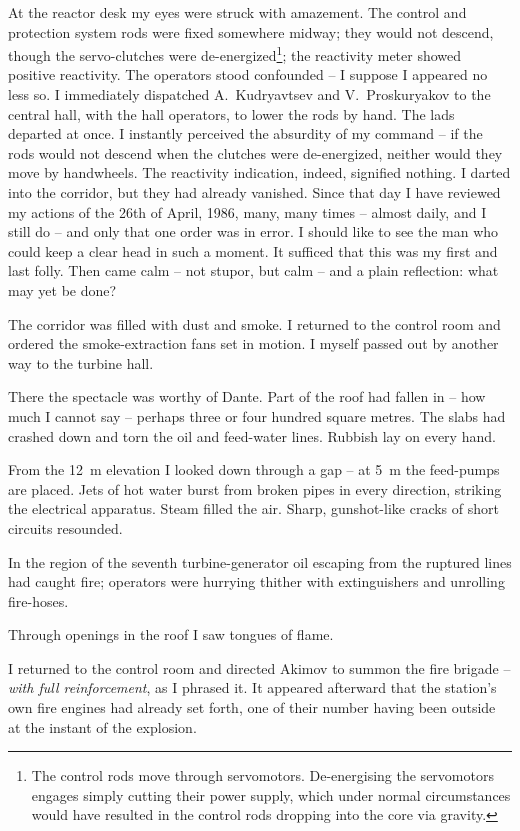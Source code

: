 \documentclass[openright]{bookest}
\begin{document}
At the reactor desk my eyes were struck with amazement. The control and protection system rods were fixed somewhere midway; they would not descend, though the servo-clutches were de-energized\footnote{The control rods move through servomotors. De-energising the servomotors engages simply cutting their power supply, which under normal circumstances would have resulted in the control rods dropping into the core via gravity.}; the reactivity meter showed positive reactivity. The operators stood confounded -- I suppose I appeared no less so. I immediately dispatched A.~Kudryavtsev and V.~Proskuryakov to the central hall, with the hall operators, to lower the rods by hand. The lads departed at once. I instantly perceived the absurdity of my command -- if the rods would not descend when the clutches were de-energized, neither would they move by handwheels. The reactivity indication, indeed, signified nothing. I darted into the corridor, but they had already vanished. Since that day I have reviewed my actions of the 26th of April, 1986, many, many times -- almost daily, and I still do -- and only that one order was in error. I should like to see the man who could keep a clear head in such a moment. It sufficed that this was my first and last folly. Then came calm -- not stupor, but calm -- and a plain reflection: what may yet be done?

The corridor was filled with dust and smoke. I returned to the control room and ordered the smoke-extraction fans set in motion. I myself passed out by another way to the turbine hall.

There the spectacle was worthy of Dante. Part of the roof had fallen in -- how much I cannot say -- perhaps three or four hundred square metres. The slabs had crashed down and torn the oil and feed-water lines. Rubbish lay on every hand.

From the \qty{+12}{\metre} elevation I looked down through a gap -- at \qty{+5}{\metre} the feed-pumps are placed. Jets of hot water burst from broken pipes in every direction, striking the electrical apparatus. Steam filled the air. Sharp, gunshot-like cracks of short circuits resounded.

In the region of the seventh turbine-generator oil escaping from the ruptured lines had caught fire; operators were hurrying thither with extinguishers and unrolling fire-hoses.

Through openings in the roof I saw tongues of flame.


I returned to the control room and directed Akimov to summon the fire brigade -- \textit{with full reinforcement}, as I phrased it. It appeared afterward that the station's own fire engines had already set forth, one of their number having been outside at the instant of the explosion.
\end{document}
